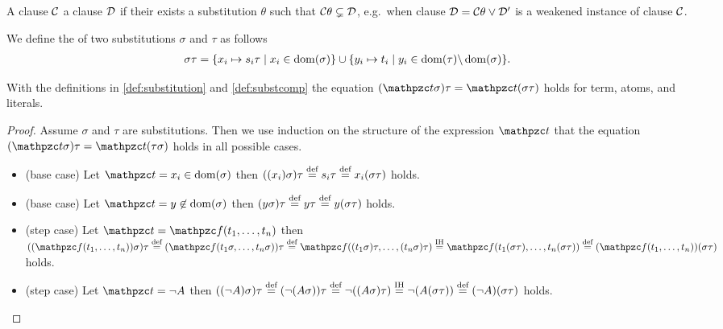 \begin{definition}
	A clause \( \mcC \)  a clause \( \mcD \) if their exists a substitution \( \theta \) such that \( \mcC\theta \subsetneq \mcD \),
	e.g.~when clause \( \mcD = \mcC\theta \lor \mcD' \) is a weakened instance of clause \( \mcC \).
\end{definition}

\begin{definition}\label{def:substcomp}
We define the  of two substitutions \( \sigma \) and \( \tau \) as follows
	\begin{align*}
		\sigma\tau&=\{ x_i\mapsto s_i\tau\mid x_i\in\domain(\sigma) \}
		\cup
		\{ y_i\mapsto t_i\mid y_i\in\domain(\tau) \backslash \domain(\sigma) \}.
	\end{align*}
\end{definition}

\begin{lemma}\label{lem:substitution}
	With the definitions in \ref{def:substitution} and \ref{def:substcomp} the equation
	\( (\mct\sigma)\tau = \mct(\sigma\tau) \) holds for
	term, atoms, and literals.
\end{lemma}

\begin{proof}
	Assume \( \sigma \) and \( \tau \) are substitutions.
	Then we use induction on the structure of the 	expression \( \mct \)
	that the equation \( (\mct\sigma)\tau =  \mct(\tau\sigma) \) holds in all possible cases.
	\begin{itemize}
		\item (base case) Let \( \mct = x_i \in\domain(\sigma) \) then
		\( ((x_i)\sigma)\tau\defEQ s_i\tau\defEQ x_i(\sigma\tau) \) holds.

		\item (base case) Let \( \mct = y \not\in\domain(\sigma) \) then
		\( (y\sigma)\tau \defEQ y\tau \defEQ y(\sigma\tau) \) holds.

		\item (step case) Let \( \mct = \mcf(t_1,\ldots,t_n) \)
		then
		$((\mcf(t_1,\ldots,t_n))\sigma)\tau
		\defEQ
		(\mcf(t_1\sigma,\ldots,t_n\sigma))\tau
		\defEQ
		\mcf((t_1\sigma)\tau,\ldots,(t_n\sigma)\tau)
		\defEQ[IH]
		\mcf(t_1(\sigma\tau),\ldots,t_n(\sigma\tau))
		\defEQ
		(\mcf(t_1,\ldots,t_n))(\sigma\tau)
		$ holds.

		\item (step case) Let \( \mct = \lnot A \) then
		$((\lnot A)\sigma)\tau
		\defEQ
		(\lnot(A\sigma))\tau
		\defEQ
		\lnot((A\sigma)\tau)
		\defEQ[IH]
		\lnot(A(\sigma\tau))
		\defEQ
		(\lnot A)(\sigma\tau)
		$ holds.
	\end{itemize}
\end{proof}
